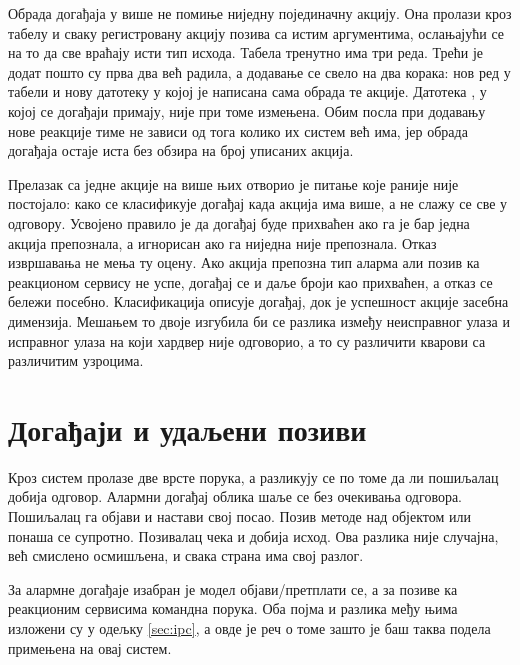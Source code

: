 \documentclass[12pt,oneside]{memoir}
\begin{document}
Обрада догађаја у  више не помиње ниједну појединачну акцију. Она
пролази кроз табелу и сваку регистровану акцију позива са истим аргументима, ослањајући се
на то да све враћају исти тип исхода. Табела тренутно има три реда. Трећи је додат пошто су
прва два већ радила, а додавање се свело на два корака: нов ред у табели и нову датотеку у
којој је написана сама обрада те акције. Датотека , у којој се догађаји
примају, није при томе измењена. Обим посла при додавању нове реакције тиме не зависи од тога
 колико их систем већ има, јер обрада догађаја остаје иста без обзира на број уписаних акција.

Прелазак са једне акције на више њих отворио је питање које раније није постојало: како се
класификује догађај када акција има више, а не слажу се све у одговору. Усвојено правило је
да догађај буде прихваћен ако га је бар једна акција препознала, а игнорисан ако га
ниједна није препознала. Отказ извршавања не мења ту оцену. Ако акција препозна тип аларма
али позив ка реакционом сервису не успе, догађај се и даље броји као прихваћен, а отказ се
бележи посебно. Класификација описује догађај, док је успешност акције засебна димензија.
Мешањем то двоје изгубила би се разлика између неисправног улаза и исправног улаза на који
хардвер није одговорио, а то су различити кварови са различитим узроцима.

\section{Догађаји и удаљени позиви}
\label{sec:dogadjaji}

Кроз систем пролазе две врсте порука, а разликују се по томе да ли пошиљалац добија одговор. Алармни
догађај облика  шаље се без очекивања одговора. Пошиљалац га објави и настави
свој посао. Позив методе  над објектом  или
 понаша се супротно. Позивалац чека и добија исход. Ова разлика није
случајна, већ смислено осмишљена, и свака страна има свој разлог.

За алармне догађаје изабран је модел објави/претплати се, а за позиве ка реакционим сервисима
 командна порука. Оба појма и разлика међу њима изложени су у одељку \ref{sec:ipc},
  а овде је реч о томе зашто је баш таква подела примењена на овај систем.
\end{document}
